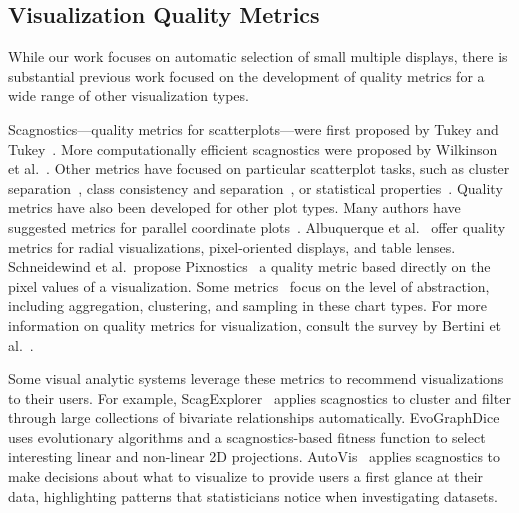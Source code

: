 \subsection{Visualization Quality Metrics}
While our work focuses on automatic selection of small multiple displays, there is substantial previous work focused on the development of quality metrics for a wide range of other visualization types. 

Scagnostics---quality metrics for scatterplots---were first proposed by Tukey and Tukey~\cite{Tukey1982, Tukey1985}. More computationally efficient scagnostics were proposed by Wilkinson et al.~\cite{Wilkinson2005, Wilkinson2008}. Other metrics have focused on particular scatterplot tasks, such as cluster separation~\cite{Sedlmair2012, Tatu2009}, class consistency and separation~\cite{Sips2009, Schafer2013}, or statistical properties~\cite{Kandel2012, Seo2005, Piringer2008}.
Quality metrics have also been developed for other plot types. Many authors have suggested metrics for parallel coordinate plots~\cite{Ankerst1998, Dasgupta2010, Johansson2009, Yang2003}. Albuquerque et al.~\cite{Albuquerque2010} offer quality metrics for radial visualizations, pixel-oriented displays, and table lenses. Schneidewind et al.\ propose Pixnostics~\cite{Schneidewind2006} a quality metric based directly on the pixel values of a visualization. Some metrics~\cite{Bertini2006, Cui2006, Yang2003} focus on the level of abstraction, including aggregation, clustering, and sampling in these chart types. For more information on quality metrics for visualization, consult the survey by Bertini et al.~\cite{Bertini2011}. 

Some visual analytic systems leverage these metrics to recommend visualizations to their users. For example, ScagExplorer~\cite{Dang2014} applies scagnostics to cluster and filter through large collections of bivariate relationships automatically.
EvoGraphDice~\cite{Boukhelifa2013} uses evolutionary algorithms and a scagnostics-based fitness function to select interesting linear and non-linear 2D projections.
AutoVis~\cite{Wills2010} applies scagnostics to make decisions about what to visualize to provide users a first glance at their data, highlighting patterns that statisticians notice when investigating datasets.



